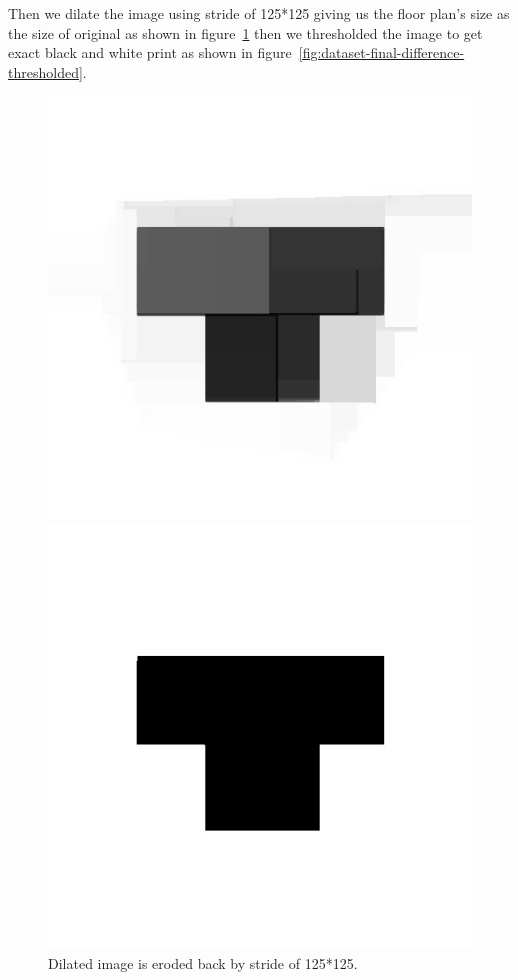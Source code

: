             \break    
            Then we dilate the image using stride of 125*125 giving us the floor plan's size as the size of original as shown in figure~\ref{fig:dataset-final-difference-dilated} then we thresholded the image to get exact black and white print as shown in figure~\ref{fig:dataset-final-difference-thresholded}.\\
            \begin{figure}[h]
                \centering
                \begin{minipage}{.45\textwidth}
                    \centering
                    \includegraphics[width=.8\linewidth,frame]{img/experiment/dataset/8dilate_diff_img.jpg}
                    \caption{Dilated image is eroded back by stride of 125*125.}
                    \label{fig:dataset-final-difference-dilated}
                \end{minipage}%
                \hfill
                \begin{minipage}{.45\textwidth}
                    \centering
                    \includegraphics[width=.8\linewidth,frame]{img/experiment/dataset/9footprint.jpg}

\end{minipage}
\end{figure}
